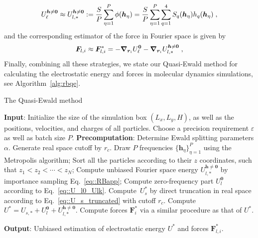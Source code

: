 \begin{equation}\label{eq::RBapp}
 U_\ell^{\boldsymbol{h}\neq \bm{0}} \approx U_{l,\ast}^{\boldsymbol{h}\neq \bm{0}}  :=   \frac{S}{P}\sum_{\eta=1}^P \phi(\boldsymbol{h}_{\eta})=  \frac{S}{P}\sum_{\eta=1}^P \sum_{q=1}^4S_q(\boldsymbol{h}_{\eta})h_q(\boldsymbol{h}_{\eta})\;,
\end{equation} 
and the corresponding estimator of the force in Fourier space is given by
\begin{equation}
	 \bm{F}_{l,i}\approx\bm{F}_{l,i}^*=-  \boldsymbol{\nabla}_{\boldsymbol{r}_i} U_\ell^{\bm{0}}- \boldsymbol{\nabla}_{\boldsymbol{r}_i} U_{l,\ast}^{\boldsymbol{h}\neq \bm{0}}\;,
 \end{equation}
Finally, combining all these strategies, we state our Quasi-Ewald method for calculating the electrostatic energy and forces in molecular dynamics simulations, see Algorithm~\ref{alg:rbqe}.
\begin{algorithm}[ht] 
\caption{The Quasi-Ewald method}
\begin{algorithmic}[1]
    \State \textbf{Input}:  Initialize the size of the simulation box $(L_x,L_y, H)$, as well as the positions, velocities, and charges of all particles. Choose a precision requirement $\varepsilon$ as well as batch size $P$.
    \State \textbf{Precomputation}:  Determine Ewald splitting parameters $\alpha$. Generate real space cutoff by $r_c$.
    \Procedure{}       
        \State Draw $P$ frequencies $\{\bm{h}_{\eta}\}_{\eta=1}^{P}$ using the Metropolis algorithm;
        \State Sort all the particles according to their $z$ coordinates, such that $z_1 < z_2 < \cdots < z_N$;
        \State Compute unbiased Fourier space energy $U_{l, *}^{\bm{h}\neq\bm{0}}$ by importance sampling Eq.~\eqref{eq::RBapp};
        \State Compute zero-frequency part $U_{l}^{\bm{0}}$ according to Eq.~\eqref{eq::U_l0_Ulk}.
        \State Compute~$U_{s}^{*}$ by direct truncation in real space according to Eq.~\eqref{eq::U_s_truncated} with cutoff $r_c$. %
        \State Compute $U^{*} = U_{s, *} + U_{l}^{\bm{0}} + U_{l, *}^{\bm{h}\neq\bm{0}}$.
        \State Compute forces $\bm{F}_{i}^{*}$ via a similar procedure as that of $U^{*}$.
    \EndProcedure

    \State \textbf{Output}: Unbiased estimation of electrostatic energy $U^{*}$ and forces $\bm{F}_{l,i}^{*}$.
\end{algorithmic}\label{alg:rbqe}
\end{algorithm}
